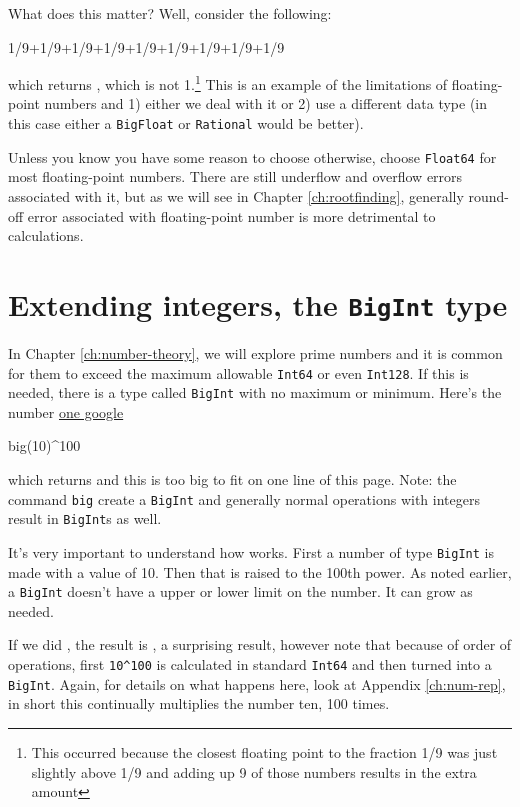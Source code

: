 What does this matter?  Well, consider the following:
\begin{jlblock}[types]
1/9+1/9+1/9+1/9+1/9+1/9+1/9+1/9+1/9
\end{jlblock}
which returns  \printpythontex[verb], which is not 1.\footnote{This occurred because the closest floating point to the fraction 1/9 was just slightly above 1/9 and adding up 9 of those numbers results in the extra amount}  This is an example of the limitations of floating-point numbers and 1) either we deal with it or 2) use a different data type (in this case either a \texttt{BigFloat} or \texttt{Rational} would be better). 

Unless you know you have some reason to choose otherwise, choose \verb!Float64! for most floating-point numbers.  There are still underflow and overflow errors associated with it, but as we will see in Chapter \ref{ch:rootfinding}, generally round-off error associated with floating-point number is more detrimental to calculations. 


\section{Extending integers, the \texttt{BigInt} type}

In Chapter \ref{ch:number-theory}, we will explore prime numbers and it is common for them to exceed the maximum allowable \texttt{Int64} or even \texttt{Int128}.  If this is needed, there is a type called \texttt{BigInt} with no maximum or minimum.  Here's the number \href{https://www.imdb.com/name/nm0000478/?ref_=tt_ov_st_sm}{one google} 

\begin{jlblock}[types]
big(10)^100
\end{jlblock}
which returns  \printpythontex[verbatim][breakanywhere=true]
%
and this is too big to fit on one line of this page.  Note: the command \verb!big! create a \texttt{BigInt} and generally normal operations with integers result in \texttt{BigInt}s as well.  

It's very important to understand how  works.  First a number of type \texttt{BigInt} is made with a value of 10.  Then that is raised to the 100th power.  As noted earlier, a \texttt{BigInt} doesn't have a upper or lower limit on the number.  It can grow as needed.   

If we did , the result is \printpythontex[verb], a surprising result, however note that because of order of operations, first \verb!10^100! is calculated in standard \texttt{Int64} and then turned into a \texttt{BigInt}.  Again, for details on what happens here, look at Appendix \ref{ch:num-rep}, in short this continually multiplies the number ten, 100 times.  

